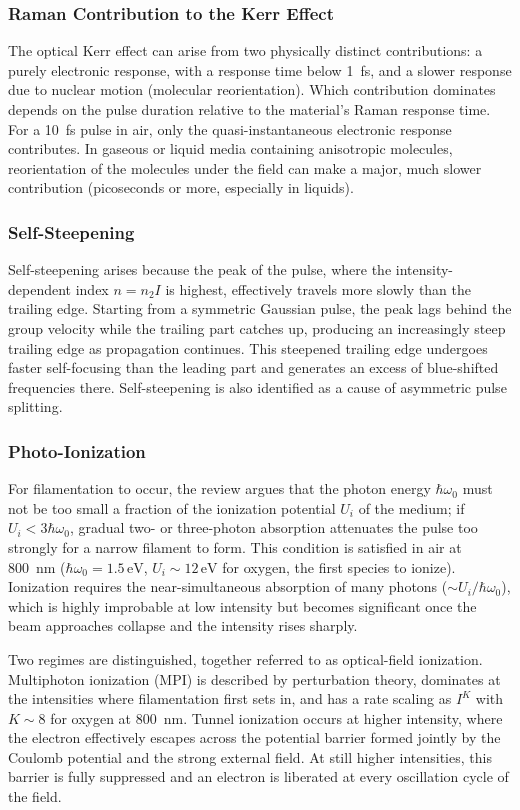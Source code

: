 \documentclass[11pt,a4paper]{article}
\begin{document}
\subsubsection{Raman Contribution to the Kerr Effect}
The optical Kerr effect can arise from two physically distinct contributions: a purely electronic response, with a response time below 1~fs, and a slower response due to nuclear motion (molecular reorientation). Which contribution dominates depends on the pulse duration relative to the material's Raman response time. For a 10~fs pulse in air, only the quasi-instantaneous electronic response contributes. In gaseous or liquid media containing anisotropic molecules, reorientation of the molecules under the field can make a major, much slower contribution (picoseconds or more, especially in liquids).

\subsubsection{Self-Steepening}
Self-steepening arises because the peak of the pulse, where the intensity-dependent index $n=n_2I$ is highest, effectively travels more slowly than the trailing edge. Starting from a symmetric Gaussian pulse, the peak lags behind the group velocity while the trailing part catches up, producing an increasingly steep trailing edge as propagation continues. This steepened trailing edge undergoes faster self-focusing than the leading part and generates an excess of blue-shifted frequencies there. Self-steepening is also identified as a cause of asymmetric pulse splitting.

\subsubsection{Photo-Ionization}
For filamentation to occur, the review argues that the photon energy $\hbar\omega_0$ must not be too small a fraction of the ionization potential $U_i$ of the medium; if $U_i<3\hbar\omega_0$, gradual two- or three-photon absorption attenuates the pulse too strongly for a narrow filament to form. This condition is satisfied in air at 800~nm ($\hbar\omega_0=1.5\,\text{eV}$, $U_i\sim12\,\text{eV}$ for oxygen, the first species to ionize). Ionization requires the near-simultaneous absorption of many photons ($\sim U_i/\hbar\omega_0$), which is highly improbable at low intensity but becomes significant once the beam approaches collapse and the intensity rises sharply.

Two regimes are distinguished, together referred to as optical-field ionization. Multiphoton ionization (MPI) is described by perturbation theory, dominates at the intensities where filamentation first sets in, and has a rate scaling as $I^K$ with $K\sim8$ for oxygen at 800~nm. Tunnel ionization occurs at higher intensity, where the electron effectively escapes across the potential barrier formed jointly by the Coulomb potential and the strong external field. At still higher intensities, this barrier is fully suppressed and an electron is liberated at every oscillation cycle of the field.
\end{document}
